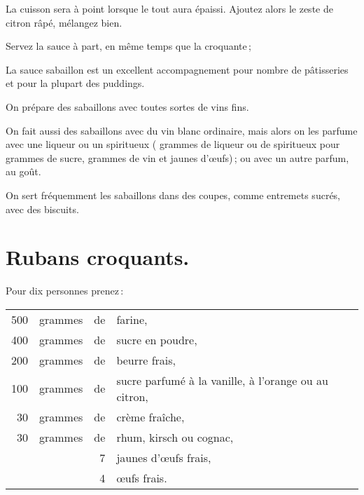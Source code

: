 La cuisson sera à point lorsque le tout aura épaissi. Ajoutez alors le zeste
de citron râpé, mélangez bien.

Servez la sauce à part, en même temps que la croquante ;

\sk

La sauce sabaillon est un excellent accompagnement pour nombre de pâtisseries
et pour la plupart des puddings.

\sk

On prépare des sabaillons avec toutes sortes de vins fins.

On fait aussi des sabaillons avec du vin blanc ordinaire, mais alors on les
parfume avec une liqueur ou un spiritueux ({\mmm} grammes de liqueur ou
de spiritueux pour {\mmm} grammes de sucre, {\mmm} grammes de vin
et {\mmm} jaunes d'œufs) ; ou avec un autre parfum, au goût.

\sk

On sert fréquemment les sabaillons dans des coupes, comme entremets sucrés,
avec des biscuits.

\section*{\centering Rubans croquants.}
{}

Pour dix personnes prenez :

\footnotesize
\begin{longtable}{rrrp{16em}}
    500 & grammes & de & farine,                                                                          \\
    400 & grammes & de & sucre en poudre,                                                                 \\
    200 & grammes & de & beurre frais,                                                                    \\
    100 & grammes & de & sucre parfumé à la vanille, à l'orange ou au citron,                             \\
     30 & grammes & de & crème fraîche,                                                                   \\
     30 & grammes & de & rhum, kirsch ou cognac,                                                          \\
        &         &  7 & jaunes d'œufs frais,                                                             \\
        &         &  4 & œufs frais.                                                                      \\
\end{longtable}
\normalsize

